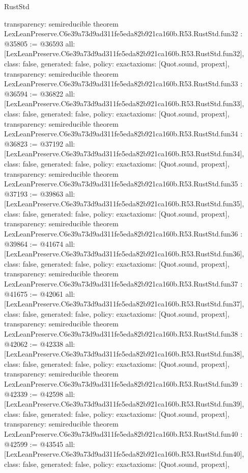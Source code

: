 \begin{lexlean}{RustStd}
\begin{coremodule}
{  transparency: semireducible
}
theorem LexLeanPreserve.C6e39a73d9ad311fe5eda82b921ca160b.R53.RustStd.fun32 : @35805 := @36593 {
  all: [LexLeanPreserve.C6e39a73d9ad311fe5eda82b921ca160b.R53.RustStd.fun32],
  class: false,
  generated: false,
  policy: exact{axioms: [Quot.sound, propext]},
  transparency: semireducible
}
theorem LexLeanPreserve.C6e39a73d9ad311fe5eda82b921ca160b.R53.RustStd.fun33 : @36594 := @36822 {
  all: [LexLeanPreserve.C6e39a73d9ad311fe5eda82b921ca160b.R53.RustStd.fun33],
  class: false,
  generated: false,
  policy: exact{axioms: [Quot.sound, propext]},
  transparency: semireducible
}
theorem LexLeanPreserve.C6e39a73d9ad311fe5eda82b921ca160b.R53.RustStd.fun34 : @36823 := @37192 {
  all: [LexLeanPreserve.C6e39a73d9ad311fe5eda82b921ca160b.R53.RustStd.fun34],
  class: false,
  generated: false,
  policy: exact{axioms: [Quot.sound, propext]},
  transparency: semireducible
}
theorem LexLeanPreserve.C6e39a73d9ad311fe5eda82b921ca160b.R53.RustStd.fun35 : @37193 := @39863 {
  all: [LexLeanPreserve.C6e39a73d9ad311fe5eda82b921ca160b.R53.RustStd.fun35],
  class: false,
  generated: false,
  policy: exact{axioms: [Quot.sound, propext]},
  transparency: semireducible
}
theorem LexLeanPreserve.C6e39a73d9ad311fe5eda82b921ca160b.R53.RustStd.fun36 : @39864 := @41674 {
  all: [LexLeanPreserve.C6e39a73d9ad311fe5eda82b921ca160b.R53.RustStd.fun36],
  class: false,
  generated: false,
  policy: exact{axioms: [Quot.sound, propext]},
  transparency: semireducible
}
theorem LexLeanPreserve.C6e39a73d9ad311fe5eda82b921ca160b.R53.RustStd.fun37 : @41675 := @42061 {
  all: [LexLeanPreserve.C6e39a73d9ad311fe5eda82b921ca160b.R53.RustStd.fun37],
  class: false,
  generated: false,
  policy: exact{axioms: [Quot.sound, propext]},
  transparency: semireducible
}
theorem LexLeanPreserve.C6e39a73d9ad311fe5eda82b921ca160b.R53.RustStd.fun38 : @42062 := @42338 {
  all: [LexLeanPreserve.C6e39a73d9ad311fe5eda82b921ca160b.R53.RustStd.fun38],
  class: false,
  generated: false,
  policy: exact{axioms: [Quot.sound, propext]},
  transparency: semireducible
}
theorem LexLeanPreserve.C6e39a73d9ad311fe5eda82b921ca160b.R53.RustStd.fun39 : @42339 := @42598 {
  all: [LexLeanPreserve.C6e39a73d9ad311fe5eda82b921ca160b.R53.RustStd.fun39],
  class: false,
  generated: false,
  policy: exact{axioms: [Quot.sound, propext]},
  transparency: semireducible
}
theorem LexLeanPreserve.C6e39a73d9ad311fe5eda82b921ca160b.R53.RustStd.fun40 : @42599 := @43545 {
  all: [LexLeanPreserve.C6e39a73d9ad311fe5eda82b921ca160b.R53.RustStd.fun40],
  class: false,
  generated: false,
  policy: exact{axioms: [Quot.sound, propext]},
}
\end{coremodule}
\end{lexlean}
